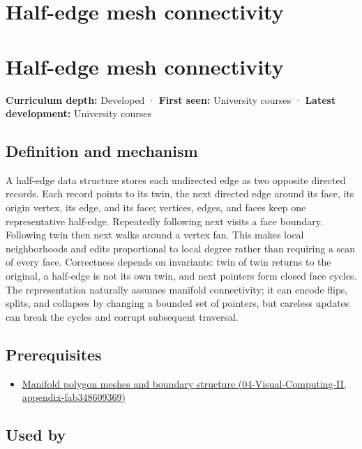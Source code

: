 \hypertarget{appendix-1aea26b2307f}{}
\section*{Half-edge mesh connectivity}
\section{Half-edge mesh connectivity}\label{half-edge-mesh-connectivity}

\textbf{Curriculum depth:} Developed · \textbf{First seen:} University courses · \textbf{Latest development:} University courses

\subsection{Definition and mechanism}\label{definition-and-mechanism}

A half-edge data structure stores each undirected edge as two opposite directed records. Each record points to its twin, the next directed edge around its face, its origin vertex, its edge, and its face; vertices, edges, and faces keep one representative half-edge. Repeatedly following next visits a face boundary. Following twin then next walks around a vertex fan. This makes local neighborhoods and edits proportional to local degree rather than requiring a scan of every face. Correctness depends on invariants: twin of twin returns to the original, a half-edge is not its own twin, and next pointers form closed face cycles. The representation naturally assumes manifold connectivity; it can encode flips, splits, and collapses by changing a bounded set of pointers, but careless updates can break the cycles and corrupt subsequent traversal.

\subsection{Prerequisites}\label{prerequisites}

\begin{itemize}
\tightlist
\item
  \href{}{Manifold polygon meshes and boundary structure (04-Visual-Computing-II, appendix-fab348609369)}
\end{itemize}

\subsection{Used by}\label{used-by}

